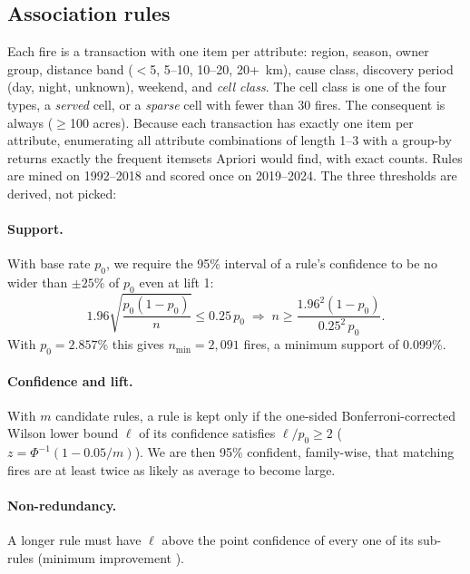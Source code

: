 \documentclass[10pt,twocolumn,letterpaper]{article}
\newcommand{\code}[1]{\texttt{\detokenize{#1}}}
\begin{document}
\subsection{Association rules}
Each fire is a transaction with one item per attribute: region, season, owner group, distance band ($<$5, 5--10, 10--20, 20+~km), cause class, discovery period (day, night, unknown), weekend, and \emph{cell class}. The cell class is one of the four types, a \emph{served} cell, or a \emph{sparse} cell with fewer than 30 fires. The consequent is always \code{LARGE} ($\geq$100 acres). Because each transaction has exactly one item per attribute, enumerating all attribute combinations of length 1--3 with a group-by returns exactly the frequent itemsets Apriori \cite{agrawal1994} would find, with exact counts. Rules are mined on 1992--2018 and scored once on 2019--2024. The three thresholds are derived, not picked:

\paragraph{Support.} With base rate $p_0$, we require the 95\% interval of a rule's confidence to be no wider than $\pm 25\%$ of $p_0$ even at lift 1:
\begin{equation}
1.96\sqrt{\frac{p_0(1-p_0)}{n}} \le 0.25\,p_0 \;\Rightarrow\; n \ge \frac{1.96^2(1-p_0)}{0.25^2\,p_0}.
\end{equation}
With $p_0=2.857\%$ this gives $n_{\min}=2{,}091$ fires, a minimum support of 0.099\%.

\paragraph{Confidence and lift.} With $m$ candidate rules, a rule is kept only if the one-sided Bonferroni-corrected Wilson lower bound $\ell$ of its confidence satisfies $\ell/p_0 \ge 2$ ($z = \Phi^{-1}(1-0.05/m)$). We are then 95\% confident, family-wise, that matching fires are at least twice as likely as average to become large.

\paragraph{Non-redundancy.} A longer rule must have $\ell$ above the point confidence of every one of its sub-rules (minimum improvement \cite{bayardo2000}).

\end{document}

